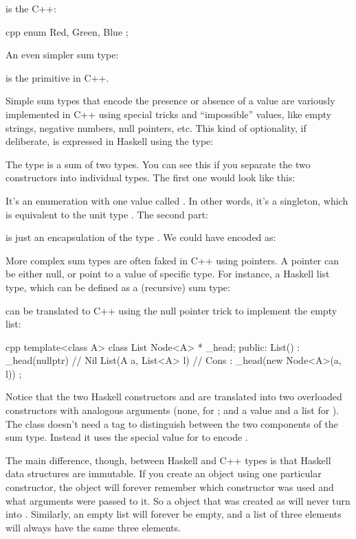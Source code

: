 is the C++:

\begin{snip}{cpp}
enum { Red, Green, Blue };
\end{snip}
An even simpler sum type:

is the primitive  in C++.

Simple sum types that encode the presence or absence of a value are
variously implemented in C++ using special tricks and ``impossible''
values, like empty strings, negative numbers, null pointers, etc. This
kind of optionality, if deliberate, is expressed in Haskell using the
 type:

The  type is a sum of two types. You can see this if you
separate the two constructors into individual types. The first one would
look like this:

It's an enumeration with one value called . In other
words, it's a singleton, which is equivalent to the unit type
\code{()}. The second part:

is just an encapsulation of the type . We could have encoded
 as:

More complex sum types are often faked in C++ using pointers. A pointer
can be either null, or point to a value of specific type. For instance,
a Haskell list type, which can be defined as a (recursive) sum type:

can be translated to C++ using the null pointer trick to implement the
empty list:

\begin{snip}{cpp}
template<class A>
class List {
    Node<A> * _head;
public:
    List() : _head(nullptr) {} // Nil
    List(A a, List<A> l)       // Cons
      : _head(new Node<A>(a, l))
    {}
};
\end{snip}
Notice that the two Haskell constructors  and 
are translated into two overloaded  constructors with
analogous arguments (none, for ; and a value and a list for
). The  class doesn't need a tag to
distinguish between the two components of the sum type. Instead it uses
the special  value for  to encode
.

The main difference, though, between Haskell and C++ types is that
Haskell data structures are immutable. If you create an object using one
particular constructor, the object will forever remember which
constructor was used and what arguments were passed to it. So a
 object that was created as  will
never turn into . Similarly, an empty list will forever
be empty, and a list of three elements will always have the same three
elements.

